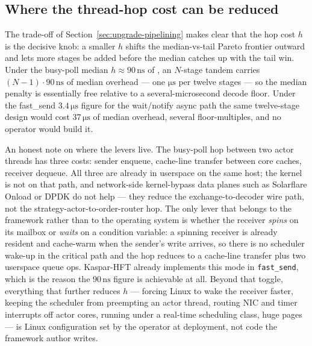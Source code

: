 \documentclass[11pt]{article}
\begin{document}
\subsection{Where the thread-hop cost can be reduced}
\label{sec:future-hopcost}

The trade-off of Section~\ref{sec:upgrade-pipelining} makes clear that the hop cost $h$ is the decisive knob: a smaller $h$ shifts the median-vs-tail Pareto frontier outward and lets more stages be added before the median catches up with the tail win. Under the busy-poll median $h \approx 90\,\mathrm{ns}$ of \citet{mayeski_actorhft}, an $N$-stage tandem carries $(N-1)\cdot 90\,\mathrm{ns}$ of median overhead --- one $\si{\micro\second}$ per twelve stages --- so the median penalty is essentially free relative to a several-microsecond decode floor. Under the fast\_send $3.4\,\si{\micro\second}$ figure for the wait/notify async path the same twelve-stage design would cost $37\,\si{\micro\second}$ of median overhead, several floor-multiples, and no operator would build it.

An honest note on where the levers live. The busy-poll hop between two actor threads has three costs: sender enqueue, cache-line transfer between core caches, receiver dequeue. All three are already in userspace on the same host; the kernel is not on that path, and network-side kernel-bypass data planes such as Solarflare Onload or DPDK do not help --- they reduce the exchange-to-decoder wire path, not the strategy-actor-to-order-router hop. The only lever that belongs to the framework rather than to the operating system is whether the receiver \emph{spins} on its mailbox or \emph{waits} on a condition variable: a spinning receiver is already resident and cache-warm when the sender's write arrives, so there is no scheduler wake-up in the critical path and the hop reduces to a cache-line transfer plus two userspace queue ops. Kaspar-HFT already implements this mode in \texttt{fast\_send}, which is the reason the $90\,\mathrm{ns}$ figure is achievable at all. Beyond that toggle, everything that further reduces $h$ --- forcing Linux to wake the receiver faster, keeping the scheduler from preempting an actor thread, routing NIC and timer interrupts off actor cores, running under a real-time scheduling class, huge pages --- is Linux configuration set by the operator at deployment, not code the framework author writes.
\end{document}
